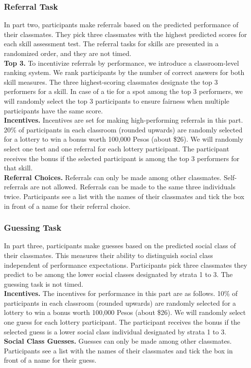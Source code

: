 \documentclass[11pt,a4paper,oneside]{article}
\begin{document}
\subsubsection{Referral Task} \label{referral_task}
In part two, participants make referrals based on the predicted performance of their classmates. They pick three classmates with the highest predicted scores for each skill assessment test. The referral tasks for skills are presented in a randomized order, and they are not timed. \medskip\\
\textbf{Top 3.} To incentivize referrals by performance, we introduce a classroom-level ranking system. We rank participants by the number of correct answers for both skill measures. The three highest-scoring classmates designate the top 3 performers for a skill. In case of a tie for a spot among the top 3 performers, we will randomly select the top 3 participants to ensure fairness when multiple participants have the same score.\medskip\\
\textbf{Incentives.} Incentives are set for making high-performing referrals in this part. 20\% of participants in each classroom (rounded upwards) are randomly selected for a lottery to win a bonus worth 100,000 Pesos (about \$26). We will randomly select one test and one referral for each lottery participant. The participant receives the bonus if the selected participant is among the top 3 performers for that skill. \medskip\\
\textbf{Referral Choices.} Referrals can only be made among other classmates. Self-referrals are not allowed. Referrals can be made to the same three individuals twice. Participants see a list with the names of their classmates and tick the box in front of a name for their referral choice. 

\subsubsection{Guessing Task}\label{guessing_task}
In part three, participants make guesses based on the predicted social class of their classmates. This measures their ability to distinguish social class independent of performance expectations. Participants pick three classmates they predict to be among the lower social classes designated by strata 1 to 3. The guessing task is not timed. \medskip\\
\textbf{Incentives.} The incentives for performance in this part are as follows. 10\% of participants in each classroom (rounded upwards) are randomly selected for a lottery to win a bonus worth 100,000 Pesos (about \$26). We will randomly select one guess for each lottery participant. The participant receives the bonus if the selected guess is a lower social class individual designated by strata 1 to 3. \medskip\\
\textbf{Social Class Guesses.} Guesses can only be made among other classmates. Participants see a list with the names of their classmates and tick the box in front of a name for their guess.
\end{document}
